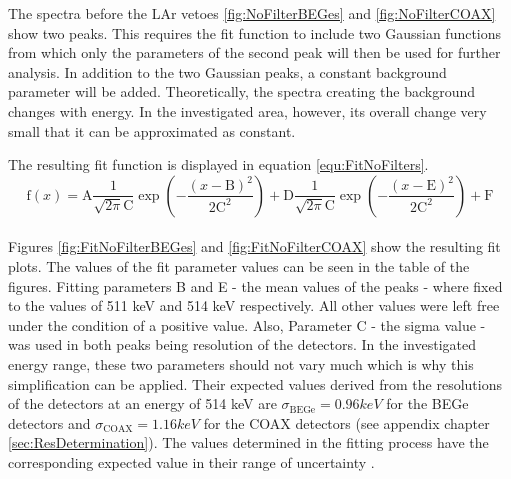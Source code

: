 \documentclass[encoding=utf8,british]{tumphthesis}
\begin{document}
The spectra before the LAr vetoes \ref{fig:NoFilterBEGes} and \ref{fig:NoFilterCOAX} show two peaks.
This requires the fit function to include two Gaussian functions from which only the parameters of the second peak will then be used for further analysis.
In addition to the two Gaussian peaks, a constant background parameter will be added.
Theoretically, the  spectra creating the background changes with energy.
In the investigated area, however, its overall change very small that it can be approximated as constant. 

The resulting fit function is displayed in equation \ref{equ:FitNoFilters}.
\\

\begin{equation}
\mathrm{f}(x) = \mathrm{A}\frac{1}{\sqrt{2\pi}\mathrm{C}}\exp\left(-\frac{(x-\mathrm{B})^2}{2\mathrm{C}^2}\right) + \mathrm{D}\frac{1}{\sqrt{2\pi}\mathrm{C}}\exp\left(-\frac{(x-\mathrm{E})^2}{2\mathrm{C}^2}\right) + \mathrm{F}
\label{equ:FitNoFilters}
\end{equation}
\\

Figures \ref{fig:FitNoFilterBEGes} and \ref{fig:FitNoFilterCOAX} show the resulting fit plots.
The values of the fit parameter values can be seen in the table of the figures.
Fitting parameters B and E - the mean values of the peaks - where fixed to the values of 511 keV and 514 keV respectively.
All other values were left free under the condition of a positive value.
Also, Parameter C - the sigma value - was used in both peaks being resolution of the detectors.
In the investigated energy range, these two parameters should not vary much which is why this simplification can be applied.
Their expected values derived from the resolutions of the detectors at an energy of 514 keV are $\sigma_{\mathrm{BEGe}} = 0.96 \unit{keV}$ for the BEGe detectors and  $\sigma_{\mathrm{COAX}} = 1.16 \unit{keV}$ for the COAX detectors (see appendix chapter \ref{sec:ResDetermination}).
The values determined in the fitting process have the corresponding expected value in their range of uncertainty .
\\
\end{document}
